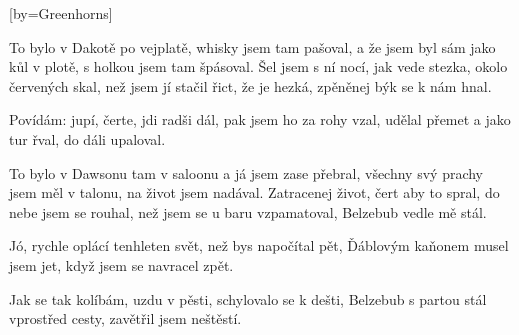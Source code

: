 [by={Greenhorns}]

\beginverse{}
To bylo v Dakotě po vejplatě,
whisky jsem tam pašoval,
a že jsem byl sám jako kůl v plotě,
s holkou jsem tam špásoval.
Šel jsem s ní nocí, jak vede stezka,
okolo červených skal,
než jsem jí stačil řict, že je hezká,
zpěněnej býk se k nám hnal.
\endverse{}

\beginchorus{}
Povídám: jupí, čerte, jdi radši dál,
pak jsem ho za rohy vzal,
udělal přemet a jako tur řval,
do dáli upaloval.
\endchorus{}

\beginverse{}
To bylo v Dawsonu tam v saloonu
a já jsem zase přebral,
všechny svý prachy jsem měl v talonu,
na život jsem nadával.
Zatracenej život, čert aby to spral,
do nebe jsem se rouhal,
než jsem se u baru vzpamatoval,
Belzebub vedle mě stál.
\endverse{}

\beginchorus{}
\phantom{}
\endchorus{}

\beginverse{}
Jó, rychle oplácí tenhleten svět,
než bys napočítal pět,
Ďáblovým kaňonem musel jsem jet,
když jsem se navracel zpět.
\endverse{}

\beginverse{}
Jak se tak kolíbám, uzdu v pěsti,
schylovalo se k dešti,
Belzebub s partou stál vprostřed cesty,
zavětřil jsem neštěstí.
\endverse{}

\beginchorus{}
\phantom{}
\endchorus{}

\endsong{}
